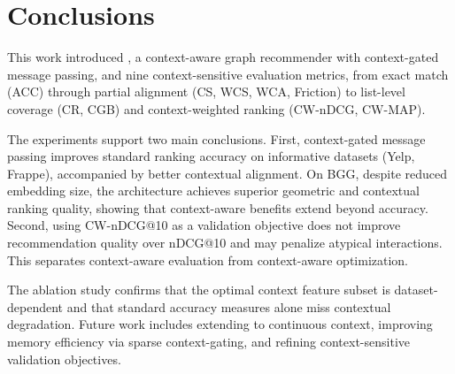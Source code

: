 \section{Conclusions}
\label{sec:conclusions}

This work introduced \modelname{}, a context-aware graph recommender with context-gated message passing, and nine context-sensitive evaluation metrics, from exact match (ACC) through partial alignment (CS, WCS, WCA, Friction) to list-level coverage (CR, CGB) and context-weighted ranking (CW-nDCG, CW-MAP).

The experiments support two main conclusions. First, context-gated message passing improves standard ranking accuracy on informative datasets (Yelp, Frappe), accompanied by better contextual alignment. On BGG, despite reduced embedding size, the architecture achieves superior geometric and contextual ranking quality, showing that context-aware benefits extend beyond accuracy. Second, using CW-nDCG@10 as a validation objective does not improve recommendation quality over nDCG@10 and may penalize atypical interactions. This separates context-aware evaluation from context-aware optimization.

The ablation study confirms that the optimal context feature subset is dataset-dependent and that standard accuracy measures alone miss contextual degradation. Future work includes extending to continuous context, improving memory efficiency via sparse context-gating, and refining context-sensitive validation objectives.
